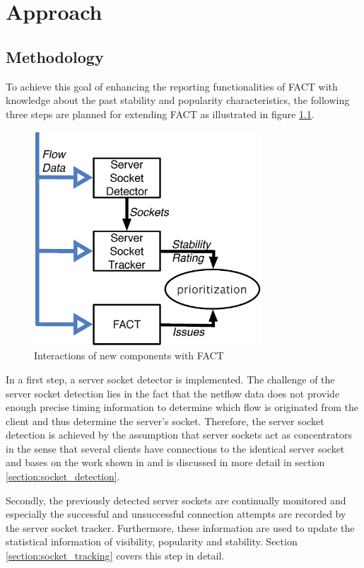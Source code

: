 

\chapter{Approach
\label{chapter:approach}}

\section{Methodology
\label{section:methodology}}

To achieve this goal of enhancing the reporting functionalities of FACT with
knowledge about the past stability and popularity characteristics, the following
three steps are planned for extending FACT as illustrated in figure
\ref{fig:FACT}.
\begin{figure}
	[ht] \centering
	\includegraphics[width=8.5cm]{images/Approach_blockdiagram.eps}
	\caption{Interactions of new components with FACT} 
	\label{fig:FACT} 
\end{figure}

In a first step, a server socket detector is implemented. The challenge of the
server socket detection lies in the fact that the netflow data does not provide
enough precise timing information to determine which flow is originated from the
client and thus determine the server's socket. Therefore, the server socket
detection is achieved by the assumption that server sockets act as concentrators
in the sense that several clients have connections to the identical server
socket and bases on the work shown in
\cite{Schatzmann:Dissection,Schatzmann:Mining,Schatzmann:Tracing} and is
discussed in more detail in section \ref{section:socket_detection}.

Secondly, the previously detected server sockets are continually monitored and
especially the successful and unsuccessful connection attempts are recorded by
the server socket tracker.
Furthermore, these information are used to update the statistical information of
visibility, popularity and stability. Section \ref{section:socket_tracking}
covers this step in detail.

